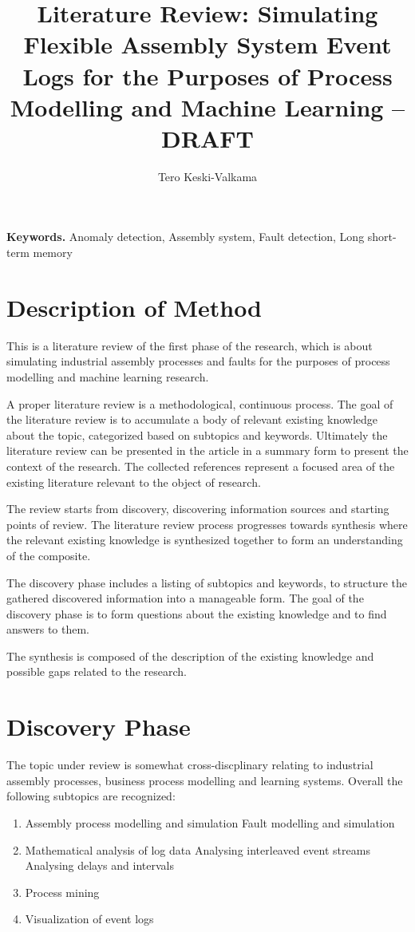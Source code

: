 \documentclass[a4paper,10pt]{article}
\title{Literature Review: Simulating Flexible Assembly System Event Logs for the Purposes of Process Modelling and Machine Learning – DRAFT}
\author{Tero Keski-Valkama}
\begin{document}
\maketitle

\smallskip
\noindent \textbf{Keywords.} Anomaly detection, Assembly system, Fault detection, Long short-term memory

\section{Description of Method}

This is a literature review of the first phase of the research, which is about simulating industrial assembly processes and faults for the purposes of
process modelling and machine learning research.

A proper literature review is a methodological, continuous process. The goal of the literature review is to accumulate a body of relevant existing knowledge
about the topic, categorized based on subtopics and keywords.
Ultimately the literature review can be presented in the article in a summary form to present the context of the research.
The collected references represent a focused area of the existing literature relevant to the object of research.

The review starts from discovery, discovering information sources and starting points of review. The literature review process progresses towards synthesis
where the relevant existing knowledge is synthesized together to form an understanding of the composite.

The discovery phase includes a listing of subtopics and keywords, to structure the gathered discovered information into a manageable form. The goal
of the discovery phase is to form questions about the existing knowledge and to find answers to them.

The synthesis is composed of the description of the existing knowledge and possible gaps related to the research.

\section{Discovery Phase}

The topic under review is somewhat cross-discplinary relating to industrial assembly processes, business process modelling and learning systems.
Overall the following subtopics are recognized:
\begin{enumerate}
 \item Assembly process modelling and simulation
   \subitem Fault modelling and simulation
 \item Mathematical analysis of log data
   \subitem Analysing interleaved event streams
   \subitem Analysing delays and intervals
 \item Process mining
 \item Visualization of event logs
\end{enumerate}
\end{document}
